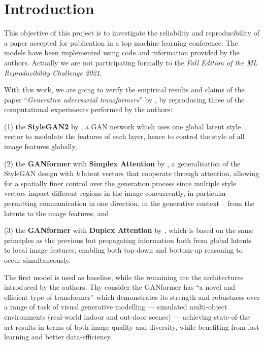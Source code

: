 \documentclass{article}
\begin{document}
	\section{Introduction}
	This objective of this project is to investigate the reliability and reproducibility of a paper accepted 
	for publication in a top machine learning conference.
	The models have been implemented using code and information provided by the authors.	
	Actually we are not participating formally to the \textit{Fall Edition of the ML Reproducibility 
	Challenge 2021}.
	
	With this work, we are going to verify the empirical results and claims of the paper 
	``\emph{Generative adversarial transformers}'' by \citet{hudson2021generative}, by reproducing 
	three of the computational experiments performed by the authors:
	\begin{enumerate*}
		\item[(1)] the \textbf{StyleGAN2} by \citet{karras2020analyzing,karras2019style}, a GAN 
		network which uses one 
		global latent style vector to modulate the features of each layer, hence to control the style of all 
		image features globally,
		\item[(2)] the \textbf{GANformer} with \textbf{Simplex Attention} by 
		\citet{hudson2021generative}, a generalisation of the StyleGAN design with \textit{k} latent 
		vectors that cooperate through attention, allowing for a spatially finer control over the generation 
		process since multiple style vectors impact different regions in the image concurrently, in 
		particular permitting communication in one direction, in the generative context – from the latents 
		to the image features, and
		\item[(3)] the \textbf{GANformer} with \textbf{Duplex Attention} by \citet{hudson2021generative}, 
		which is based on the same principles as the previous but propagating information both from 
		global latents to local image features, enabling both top-down and bottom-up reasoning to occur 
		simultaneously.
	\end{enumerate*} 
	
	The first model is used as baseline, while the remaining are the architectures introduced by the 
	authors. Thy consider the GANformer has ``a novel and efficient type of transformer'' which 
	demonstrates its strength and robustness over a range of task of visual generative modelling —  
	simulated multi-object environments (real-world indoor and out-door scenes) — achieving 
	state-of-the-art results in terms of both image quality and diversity, while benefiting from fast 
	learning and better data-efficiency. 
	
\end{document}
